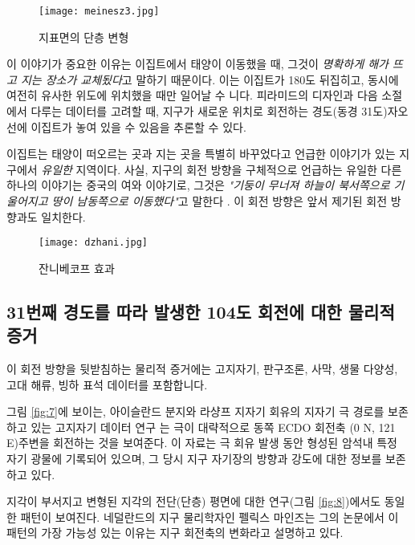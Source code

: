 \documentclass[10pt,twocolumn,letterpaper]{article}
\begin{document}
\begin{figure}[t]
\begin{center}
   \texttt{[image: meinesz3.jpg]}
\end{center}
   \caption{지표면의 단층 변형  \cite{36}}
\label{fig:8}
\label{fig:onecol}
\end{figure}


이 이야기가 중요한 이유는 이집트에서 태양이 이동했을 때, 그것이 \textit{ 명확하게 해가 뜨고 지는 장소가 교체됬다}고 말하기 때문이다. 이는 이집트가 180도 뒤집히고, 동시에 여전히 유사한 위도에 위치했을 때만 일어날 수 니다. 피라미드의 디자인과 다음 소절에서 다루는 데이터를 고려할 때, 지구가 새로운 위치로 회전하는 경도(동경 31도)자오선에 이집트가  놓여 있을 수 있음을 추론할 수 있다.

이집트는 태양이 떠오르는 곳과 지는 곳을 특별히 바꾸었다고 언급한 이야기가 있는 지구에서 \textit{유일한} 지역이다. 사실, 지구의 회전 방향을 구체적으로 언급하는 유일한 다른 하나의 이야기는 중국의 여와 이야기로, 그것은 \textit{"기둥이 무너져 하늘이 북서쪽으로 기울어지고 땅이 남동쪽으로 이동했다"}고 말한다 \cite{8}. 이 회전 방향은 앞서 제기된 회전 방향과도 일치한다.


\begin{figure*}[t]
\begin{center}
\texttt{[image: dzhani.jpg]}
\end{center}
   \caption{잔니베코프 효과  \cite{28}}
\label{fig:10}
\end{figure*}

\subsection{31번째 경도를 따라 발생한 104도 회전에 대한 물리적 증거}


이 회전 방향을 뒷받침하는 물리적 증거에는 고지자기, 판구조론, 사막, 생물 다양성, 고대 해류, 빙하 표석 데이터를 포함합니다.

그림 \ref{fig:7}에 보이는, 아이슬란드 분지와 라샹프 지자기 회유의 지자기 극 경로를 보존하고 있는 고지자기 데이터 연구 \cite{35}는 극이 대략적으로 동쪽 ECDO 회전축 (0 N, 121 E)주변을 회전하는 것을 보여준다. 이 자료는 극 회유 발생 동안 형성된 암석내 특정 자기 광물에 기록되어 있으며, 그 당시 지구 자기장의 방향과 강도에 대한 정보를 보존하고 있다.

지각이 부서지고 변형된 지각의 전단(단층) 평면에 대한 연구(그림 \ref{fig:8})에서도  동일한 패턴이 보여진다. 네덜란드의 지구 물리학자인 펠릭스 마인즈는 그의 논문에서 \cite{36} 이 패턴의 가장 가능성 있는 이유는 지구 회전축의 변화라고 설명하고 있다.
\end{document}
